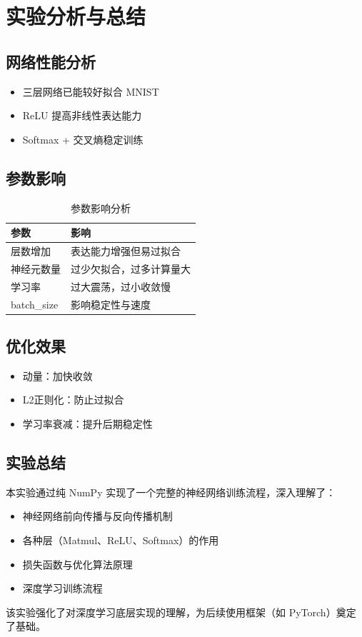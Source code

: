 \section{实验分析与总结}  %

\subsection{网络性能分析}

\begin{itemize}
\item 三层网络已能较好拟合 MNIST
\item ReLU 提高非线性表达能力
\item Softmax + 交叉熵稳定训练
\end{itemize}

\subsection{参数影响}

\begin{table}[htbp]
\centering
\begin{tabular}{|l|l|}
\hline
\textbf{参数} & \textbf{影响} \\
\hline
层数增加 & 表达能力增强但易过拟合 \\
神经元数量 & 过少欠拟合，过多计算量大 \\
学习率 & 过大震荡，过小收敛慢 \\
batch\_size & 影响稳定性与速度 \\
\hline
\end{tabular}
\caption{参数影响分析}
\label{tab:impact}
\end{table}

\subsection{优化效果}

\begin{itemize}
\item 动量：加快收敛
\item L2正则化：防止过拟合
\item 学习率衰减：提升后期稳定性
\end{itemize}

\subsection{实验总结}

本实验通过纯 NumPy 实现了一个完整的神经网络训练流程，深入理解了：

\begin{itemize}
\item 神经网络前向传播与反向传播机制
\item 各种层（Matmul、ReLU、Softmax）的作用
\item 损失函数与优化算法原理
\item 深度学习训练流程
\end{itemize}

该实验强化了对深度学习底层实现的理解，为后续使用框架（如 PyTorch）奠定了基础。